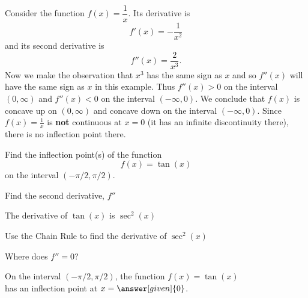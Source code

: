 \documentclass{ximera}
\begin{document}
\begin{example} %
Consider the function $f(x) = \dfrac{1}{x}.$ Its derivative is 
\[
f'(x) = -\frac{1}{x^2}
\]
and its second derivative is
\[
f''(x) = \frac{2}{x^3}.
\]
Now we make the observation that $x^3$ has the same sign as $x$ and so $f''(x)$ will have the same sign as $x$
in this example. Thus $f''(x) > 0$ on the interval $(0, \infty)$ and $f''(x) < 0$ on the interval $(-\infty,0).$
We conclude that $f(x)$ is concave up on $(0, \infty)$ and concave down on the interval $(-\infty, 0).$ 
Since $f(x) = \frac{1}{x}$ is \textbf{not} continuous at $x=0$ (it has an infinite discontinuity there), 
there is no inflection point there.  

\end{example}


\begin{problem} %
  Find the inflection point(s) of the function
  \[
     f(x) = \tan(x)
  \]
	on the interval $(-\pi/2, \pi/2)$.\\
  
    \begin{hint}
      Find the second derivative, $f''$
    \end{hint}
    \begin{hint}
      The derivative of $\tan(x)$ is $\sec^2(x)$
    \end{hint}
		\begin{hint}
      Use the Chain Rule to find the derivative of $\sec^2(x)$
    \end{hint}
		\begin{hint}
      Where does $f'' = 0$?
    \end{hint}
	On the interval $(-\pi/2, \pi/2)$, the function $f(x) = \tan(x)$ \\
	has an inflection point at $x =\answer[given]{0}$.
 
\end{problem}
\end{document}
